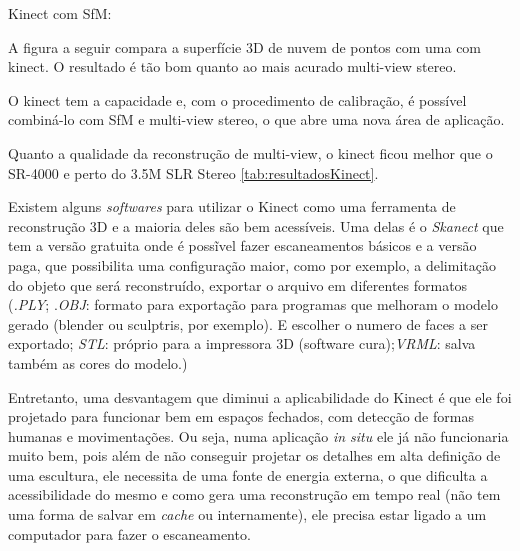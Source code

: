 Kinect com SfM:

A figura a seguir compara a superfície 3D de nuvem de pontos com uma com kinect. O resultado é tão bom quanto ao mais acurado multi-view stereo.

O kinect tem a capacidade e, com o procedimento de calibração, é possível combiná-lo com SfM e multi-view stereo, o que abre uma nova área de aplicação.

Quanto a qualidade da reconstrução de multi-view, o kinect ficou melhor que o SR-4000 e perto do 3.5M SLR Stereo \ref{tab:resultadosKinect}.

Existem alguns {\it softwares} para utilizar o Kinect como uma ferramenta de reconstrução 3D e a maioria deles são bem acessíveis. Uma delas é o {\it Skanect} que tem a versão gratuita onde é possĩvel fazer escaneamentos básicos e a versão paga, que possibilita uma configuração maior, como por exemplo, a delimitação do objeto que será reconstruído, exportar o arquivo em diferentes formatos ({\it .PLY}; {.\it OBJ}: formato para exportação para programas que melhoram o modelo gerado (blender ou sculptris, por exemplo). E escolher o numero de faces a ser exportado; {\it STL}: próprio para a impressora 3D (software cura);{\it VRML}: salva também as cores do modelo.)

Entretanto, uma desvantagem que diminui a aplicabilidade do Kinect é que ele foi projetado para funcionar bem em espaços fechados, com detecção de formas humanas e movimentações. Ou seja, numa aplicação {\it in situ} ele já não funcionaria muito bem, pois além de não conseguir projetar os detalhes em alta definição de uma escultura, ele necessita de uma fonte de energia externa, o que dificulta a acessibilidade do mesmo e como gera uma reconstrução em tempo real (não tem uma forma de salvar em {\it cache} ou internamente), ele precisa estar ligado a um computador para fazer o escaneamento.